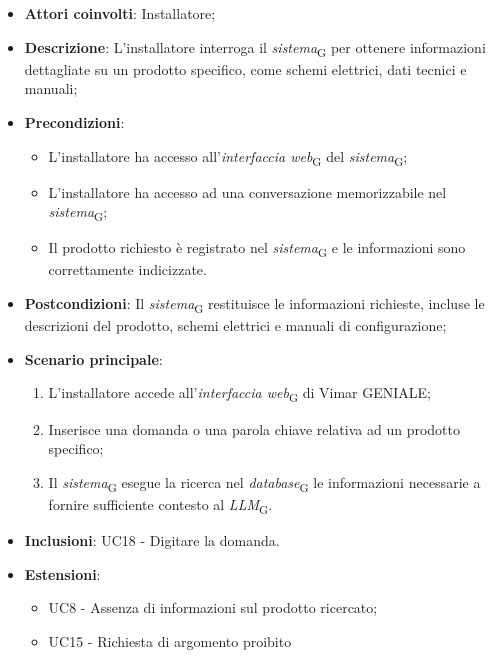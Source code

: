 \begin{itemize}
    \item \textbf{Attori coinvolti}: Installatore;
    \item \textbf{Descrizione}: L’installatore interroga il \textit{sistema}\textsubscript{G} per ottenere informazioni dettagliate su un prodotto specifico, come schemi elettrici, dati tecnici e manuali;
    \item \textbf{Precondizioni}: 
        \begin{itemize}
            \item L’installatore ha accesso all’\textit{interfaccia web}\textsubscript{G} del \textit{sistema}\textsubscript{G};
            \item L’installatore ha accesso ad una conversazione memorizzabile nel \textit{sistema}\textsubscript{G};
            \item Il prodotto richiesto è registrato nel \textit{sistema}\textsubscript{G} e le informazioni sono correttamente indicizzate.
        \end{itemize}
    \item \textbf{Postcondizioni}: Il \textit{sistema}\textsubscript{G} restituisce le informazioni richieste, incluse le descrizioni del prodotto, schemi elettrici e manuali di configurazione;
    \item \textbf{Scenario principale}:
    \begin{enumerate}
    \item L’installatore accede all’\textit{interfaccia web}\textsubscript{G} di Vimar GENIALE;
    \item Inserisce una domanda o una parola chiave relativa ad un prodotto specifico;
    \item Il \textit{sistema}\textsubscript{G} esegue la ricerca nel \textit{database}\textsubscript{G} le informazioni necessarie a fornire sufficiente contesto al \textit{LLM}\textsubscript{G}.
    \end{enumerate}
    \item \textbf{Inclusioni}: UC18 - Digitare la domanda.
    \item \textbf{Estensioni}: 
    \begin{itemize}
        \item UC8 - Assenza di informazioni sul prodotto ricercato;
        \item UC15 - Richiesta di argomento proibito
    \end{itemize}

\end{itemize}
